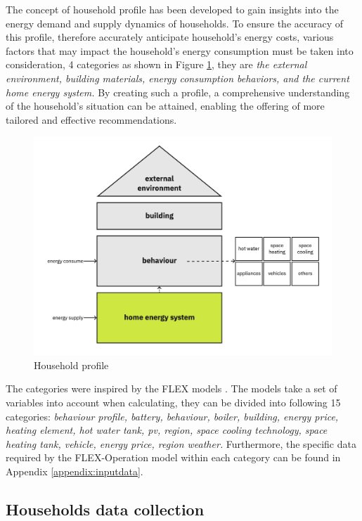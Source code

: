 The concept of household profile has been developed to gain insights into the energy demand and supply dynamics of households. 
To ensure the accuracy of this profile, therefore accurately anticipate household's energy costs, 
various factors that may impact the household's energy consumption must be taken into consideration, 4 categories as shown in Figure \ref{fig:profile}, they are 
\emph{the external environment, building materials, energy consumption behaviors, and the current home energy system.}
By creating such a profile, a comprehensive understanding of the household's situation can be attained, enabling the offering of more tailored and effective recommendations.
\begin{figure}[h]
  \centering
  \includegraphics[width=\textwidth]{Images/household_profile.jpg}
  \caption{Household profile}
  \label{fig:profile}
\end{figure}

The categories were inspired by the FLEX models \cite{newtrends}.
The models take a set of variables into account when calculating, they can be divided into following 15 categories: 
\emph{
    behaviour profile,
    battery,
    behaviour, 
    boiler,
    building,
    energy price,
    heating element, 
    hot water tank,
    \gls{pv},
    region,
    space cooling technology,
    space heating tank,
    vehicle,
    energy price,
    region weather. 
}
Furthermore, the specific data required by the FLEX-Operation model within each category can be found in Appendix \ref{appendix:inputdata}. 


\subsection{Households data collection}

